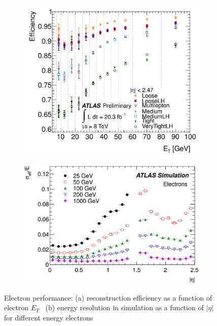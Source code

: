 \begin{figure}[h!]
  \centering
  \captionsetup{justification=centering}

	\begin{subfigure}[t]{0.5\textwidth}
        \centering
        \includegraphics[width=\textwidth]{figures/ElectronEff}
        \caption{}
    \end{subfigure}%
    \begin{subfigure}[t]{0.5\textwidth}
        \centering
        \includegraphics[width=\textwidth]{figures/ElectronResolution}
        \caption{}
    \end{subfigure}

   \caption{Electron performance: (a) reconstruction efficiency as a function of electron $E_{T}$~\cite{ElectronReco} (b) energy resolution in simulation as a function of $|\eta|$ for different energy electrons~\cite{ElectronCalib}}
  \label{fig:electrons}
\end{figure}

